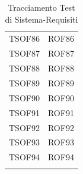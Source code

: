 \documentclass[../PianoDiQualifica_v4.0.0.tex]{subfiles}
\begin{document}
\begin{longtable}[c] { >{\centering\arraybackslash}p{3cm} >{\centering\arraybackslash}p{3cm}}
			\addlinespace[0.3em]
			\midrule
			\addlinespace[0.3em]
			TSOF86 & ROF86 \\
			\addlinespace[0.3em]
			\midrule
			\addlinespace[0.3em]
			TSOF87 & ROF87 \\
			\addlinespace[0.3em]
			\midrule
			\addlinespace[0.3em]
			TSOF88 & ROF88 \\
			\addlinespace[0.3em]
			\midrule
			\addlinespace[0.3em]
			TSOF89 & ROF89\\
			\addlinespace[0.3em]
			\midrule
			\addlinespace[0.3em]
			TSOF90 & ROF90 \\
			\addlinespace[0.3em]
			\midrule
			\addlinespace[0.3em]
			TSOF91 & ROF91 \\
			\addlinespace[0.3em]
			\midrule
			\addlinespace[0.3em]
			TSOF92 & ROF92 \\
			\addlinespace[0.3em]
			\midrule
			\addlinespace[0.3em]
			TSOF93 & ROF93 \\
			\addlinespace[0.3em]
			\midrule
			\addlinespace[0.3em]
			TSOF94 & ROF94 \\
			\bottomrule
			\caption{Tracciamento Test di Sistema-Requisiti}
	\end{longtable}
\end{document}
